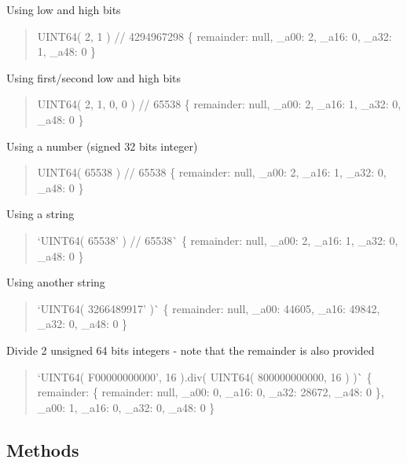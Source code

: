 \begin{DoxyItemize}
\item Using low and high bits \begin{quote}
{\ttfamily U\+I\+N\+T64( 2, 1 ) // 4294967298} \{ remainder\+: null, \+\_\+a00\+: 2, \+\_\+a16\+: 0, \+\_\+a32\+: 1, \+\_\+a48\+: 0 \} \end{quote}

\item Using first/second low and high bits \begin{quote}
{\ttfamily U\+I\+N\+T64( 2, 1, 0, 0 ) // 65538} \{ remainder\+: null, \+\_\+a00\+: 2, \+\_\+a16\+: 1, \+\_\+a32\+: 0, \+\_\+a48\+: 0 \} \end{quote}

\item Using a number (signed 32 bits integer) \begin{quote}
{\ttfamily U\+I\+N\+T64( 65538 ) // 65538} \{ remainder\+: null, \+\_\+a00\+: 2, \+\_\+a16\+: 1, \+\_\+a32\+: 0, \+\_\+a48\+: 0 \} \end{quote}

\item Using a string \begin{quote}
`U\+I\+N\+T64( \textquotesingle{}65538' ) // 65538\`{} \{ remainder\+: null, \+\_\+a00\+: 2, \+\_\+a16\+: 1, \+\_\+a32\+: 0, \+\_\+a48\+: 0 \} \end{quote}

\item Using another string \begin{quote}
`U\+I\+N\+T64( \textquotesingle{}3266489917' )\`{} \{ remainder\+: null, \+\_\+a00\+: 44605, \+\_\+a16\+: 49842, \+\_\+a32\+: 0, \+\_\+a48\+: 0 \} \end{quote}

\item Divide 2 unsigned 64 bits integers -\/ note that the remainder is also provided \begin{quote}
`U\+I\+N\+T64( \textquotesingle{}F00000000000', 16 ).div( U\+I\+N\+T64( \textquotesingle{}800000000000\textquotesingle{}, 16 ) )\`{} \{ remainder\+: \{ remainder\+: null, \+\_\+a00\+: 0, \+\_\+a16\+: 0, \+\_\+a32\+: 28672, \+\_\+a48\+: 0 \}, \+\_\+a00\+: 1, \+\_\+a16\+: 0, \+\_\+a32\+: 0, \+\_\+a48\+: 0 \} \end{quote}

\end{DoxyItemize}

\subsection*{Methods}

